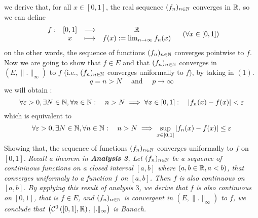 we derive that, for all $x \in [0,1]$, the real sequence 
$(f_{n})_{n \in \mathbb{N}}$ converges in $\mathbb{R} $, so we can define 
\[
\begin{array}{cccc}
	f : &  [0,1]  & \longrightarrow & \mathbb{R}  \\

           &  x  & \longmapsto     & f(x) := \lim_{n \to \infty} f_{n} (x)   \\ 
\end{array}
\quad \left( \forall x \in [0,1] \right)
\]
on the other words, the sequence of functions $(f_{n})_{n \in \mathbb{N}}$ 
converges pointwise to $f$. Now we are going to show that $f \in E$ and 
that $(f_{n})_{n \in \mathbb{N}}$ converges in $\left( E, \| . \| _{\infty } \right)$ 
to $f$ (i.e., $(f_{n})_{n \in \mathbb{N}}$ converges uniformally to $f$), by taking in 
$(1) $. 
\[
q = n > N \quad  \text{ and } \quad p \rightarrow  \infty 
\]
we will obtain : 
\[
\forall \varepsilon  > 0,  \exists N \in \mathbb{N},  \forall n \in \mathbb{N} : 
\quad n > N \implies 
\forall  x \in [0,1] : \quad \left| f_{n}(x) - f(x)  \right| < \varepsilon 
\]
which is equivalent to 
\[
\forall \varepsilon > 0, \exists N \in \mathbb{N}, \forall n \in \mathbb{N} : 
\quad n > N \implies 
\sup_{x \in [0,1]}  \left| f_{n}(x) - f(x)  \right| \leq \varepsilon 
\]
Showing that, the sequence of functions $(f_{n})_{n \in \mathbb{N}}$ converges uniformally
to $f$  on $[0,1]$. 
\divider 
\it Recall a theorem in \textbf{Analysis 3}, Let 
$(f_{n})_{n \in \mathbb{N}}$ be a sequence of continiuous functions on a closed
interval $[a,b]$ where $(a,b \in \mathbb{R}, a < b) $, that converges
uniformaly to a function $f$ on $[a,b]$. Then $f$ is also continuous 
on $[a,b]$.
\divider
\normalfont
By applying this result of analysis $3$, we derive that $f$ is also continuous
on $[0,1]$, that is $f \in E$, and $(f_{n})_{n \in \mathbb{N}}$ is convergent
in $\left( E, \| . \| _{\infty } \right)$ to $f$, we conclude that 
$\left( \mathcal{C} ^{0} \left( [0,1] ,\mathbb{R} \right), \| . \| _{\infty } \right)$ 
is Banach.  
